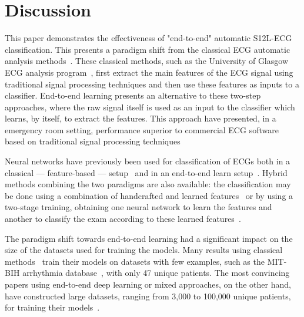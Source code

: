 \documentclass{article}
\begin{document}
\section{Discussion}

This paper demonstrates the effectiveness of "end-to-end" automatic S12L-ECG classification. This presents a paradigm shift from the classical ECG automatic analysis methods~\cite{jambukia_classification_2015}. These classical methods, such as the University of Glasgow ECG analysis program~\cite{macfarlane_university_2005}, first extract the main features of the ECG signal using traditional signal processing techniques and then use these features as inputs to a classifier. End-to-end learning presents an alternative to these two-step approaches, where the raw signal itself is used as an input to the classifier which learns, by itself, to extract the features. This approach have presented, in a emergency room setting, performance superior to commercial ECG software based on traditional signal processing techniques~\cite{smith_deep_2019}

Neural networks have previously been used for classification of ECGs both in a classical --- feature-based --- setup~\cite{cubanski_neural_1994, tripathy_novel_2019} and in an end-to-end learn setup~\cite{rubin_densely_2017, acharya_application_2017, hannun_cardiologistlevel_2019}. Hybrid methods combining the two paradigms are also available: the classification may be done using a combination of handcrafted and learned features~\cite{shashikumar_detection_2018} or by using a two-stage training, obtaining one neural network to learn the features and another to classify the exam according to these learned features~\cite{rahhal_deep_2016}. 

The paradigm shift towards end-to-end learning had a significant impact on the size of the datasets used for training the models. Many results using classical methods~\cite{jambukia_classification_2015, acharya_application_2017, rahhal_deep_2016} train their models on datasets with few examples, such as the MIT-BIH arrhythmia database~\cite{goldberger_physiobank_2000}, with only 47 unique patients. The  most convincing papers using end-to-end deep learning or mixed approaches, on the other hand, have constructed large datasets, ranging from 3,000 to 100,000 unique patients, for training their models~\cite{shashikumar_detection_2018, clifford_af_2017, hannun_cardiologistlevel_2019, smith_deep_2019}. 
\end{document}
